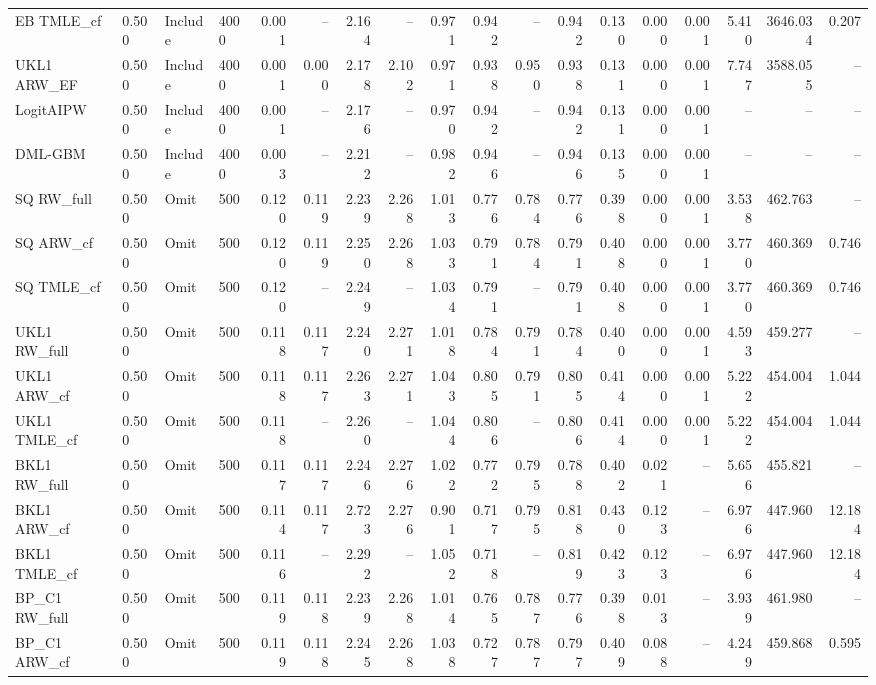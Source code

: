 \begin{tabular}{llllrrrrrrrrrrrrrr}
EB TMLE\_cf & 0.500 & Include & 4000 & 0.001 & -- & 2.164 & -- & 0.971 & 0.942 & -- & 0.942 & 0.130 & 0.000 & 0.001 & 5.410 & 3646.034 & 0.207 \\
UKL1 ARW\_EF & 0.500 & Include & 4000 & 0.001 & 0.000 & 2.178 & 2.102 & 0.971 & 0.938 & 0.950 & 0.938 & 0.131 & 0.000 & 0.001 & 7.747 & 3588.055 & -- \\
LogitAIPW & 0.500 & Include & 4000 & 0.001 & -- & 2.176 & -- & 0.970 & 0.942 & -- & 0.942 & 0.131 & 0.000 & 0.001 & -- & -- & -- \\
DML-GBM & 0.500 & Include & 4000 & 0.003 & -- & 2.212 & -- & 0.982 & 0.946 & -- & 0.946 & 0.135 & 0.000 & 0.001 & -- & -- & -- \\
SQ RW\_full & 0.500 & Omit & 500 & 0.120 & 0.119 & 2.239 & 2.268 & 1.013 & 0.776 & 0.784 & 0.776 & 0.398 & 0.000 & 0.001 & 3.538 & 462.763 & -- \\
SQ ARW\_cf & 0.500 & Omit & 500 & 0.120 & 0.119 & 2.250 & 2.268 & 1.033 & 0.791 & 0.784 & 0.791 & 0.408 & 0.000 & 0.001 & 3.770 & 460.369 & 0.746 \\
SQ TMLE\_cf & 0.500 & Omit & 500 & 0.120 & -- & 2.249 & -- & 1.034 & 0.791 & -- & 0.791 & 0.408 & 0.000 & 0.001 & 3.770 & 460.369 & 0.746 \\
UKL1 RW\_full & 0.500 & Omit & 500 & 0.118 & 0.117 & 2.240 & 2.271 & 1.018 & 0.784 & 0.791 & 0.784 & 0.400 & 0.000 & 0.001 & 4.593 & 459.277 & -- \\
UKL1 ARW\_cf & 0.500 & Omit & 500 & 0.118 & 0.117 & 2.263 & 2.271 & 1.043 & 0.805 & 0.791 & 0.805 & 0.414 & 0.000 & 0.001 & 5.222 & 454.004 & 1.044 \\
UKL1 TMLE\_cf & 0.500 & Omit & 500 & 0.118 & -- & 2.260 & -- & 1.044 & 0.806 & -- & 0.806 & 0.414 & 0.000 & 0.001 & 5.222 & 454.004 & 1.044 \\
BKL1 RW\_full & 0.500 & Omit & 500 & 0.117 & 0.117 & 2.246 & 2.276 & 1.022 & 0.772 & 0.795 & 0.788 & 0.402 & 0.021 & -- & 5.656 & 455.821 & -- \\
BKL1 ARW\_cf & 0.500 & Omit & 500 & 0.114 & 0.117 & 2.723 & 2.276 & 0.901 & 0.717 & 0.795 & 0.818 & 0.430 & 0.123 & -- & 6.976 & 447.960 & 12.184 \\
BKL1 TMLE\_cf & 0.500 & Omit & 500 & 0.116 & -- & 2.292 & -- & 1.052 & 0.718 & -- & 0.819 & 0.423 & 0.123 & -- & 6.976 & 447.960 & 12.184 \\
BP\_C1 RW\_full & 0.500 & Omit & 500 & 0.119 & 0.118 & 2.239 & 2.268 & 1.014 & 0.765 & 0.787 & 0.776 & 0.398 & 0.013 & -- & 3.939 & 461.980 & -- \\
BP\_C1 ARW\_cf & 0.500 & Omit & 500 & 0.119 & 0.118 & 2.245 & 2.268 & 1.038 & 0.727 & 0.787 & 0.797 & 0.409 & 0.088 & -- & 4.249 & 459.868 & 0.595 \\

\end{tabular}

